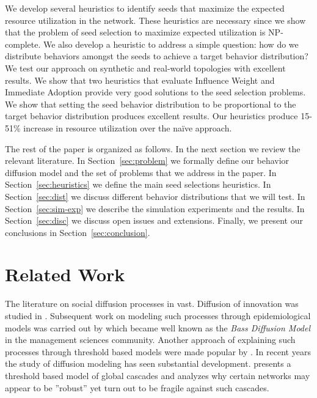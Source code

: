 \documentclass[letterpaper]{article}
\theoremstyle{plain} 		\newtheorem{thm}{Theorem}[section]
\theoremstyle{definition} 	\newtheorem{defn}[thm]{Definition}
\theoremstyle{remark}		\newtheorem{rem}{Remark}
\begin{document}
We develop several heuristics to identify seeds that maximize the expected resource utilization in the network. These heuristics are necessary since we show that the problem of seed selection to maximize expected utilization is NP-complete. We also develop a heuristic to address a simple question: how do we distribute behaviors amongst the seeds to achieve a target behavior distribution? We test our approach on synthetic and real-world topologies with excellent results. We show that two heuristics that evaluate Influence Weight  and Immediate Adoption provide very good solutions to the seed selection problems. We show that setting the seed behavior distribution to be proportional to the target behavior distribution produces excellent results. Our heuristics produce 15-51\% increase in resource utilization over the na\"ive approach.

The rest of the paper is organized as follows. In the next section we review the relevant literature. In Section~\ref{sec:problem} we formally define our behavior diffusion model and the set of problems that we address in the paper. In Section~\ref{sec:heuristics} we define the main seed selections heuristics. In Section~\ref{sec:dist} we discuss different behavior distributions that we will test. In Section~\ref{sec:sim-exp} we describe the simulation experiments and the results. In Section~\ref{sec:disc} we discuss open issues and extensions.  Finally,  we present our conclusions in Section~\ref{sec:conclusion}.

\section{Related Work}
The literature on social diffusion processes in vast. Diffusion of innovation was studied in \cite{rogers62}. Subsequent work on modeling such processes through epidemiological models was carried out by \cite{bass69} which became well known as the \textit{Bass Diffusion Model} in the management sciences community. Another approach of explaining such processes through threshold based models were made popular by \cite{granovetter83}. In recent years the study of diffusion modeling has seen substantial development. \cite{Watts02} presents a threshold based model of global cascades and analyzes why certain networks may appear to be ''robust'' yet turn out to be fragile against such cascades.
\end{document}
